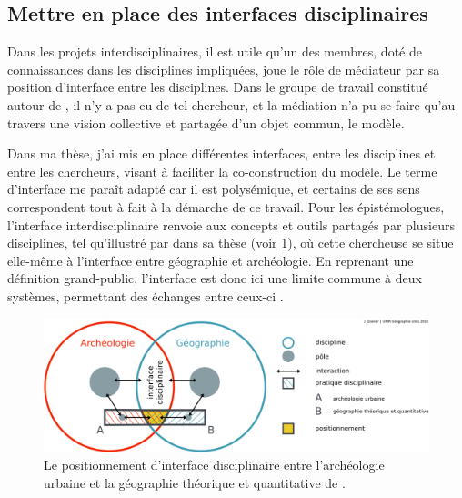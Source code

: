 \subsection{Mettre en place des interfaces disciplinaires\label{subsec:interfaces}}

Dans les projets interdisciplinaires, il est utile qu'un des membres, doté de connaissances dans les disciplines impliquées, joue le rôle de médiateur par sa position d'interface entre les disciplines.
Dans le groupe de travail constitué autour de \simfeodal{}, il n'y a pas eu de tel chercheur, et la médiation n'a pu se faire qu'au travers une vision collective et partagée d'un objet commun, le modèle.

Dans ma thèse, j'ai mis en place différentes \og interfaces\fg{}, entre les disciplines et entre les chercheurs, visant à faciliter la co-construction du modèle.
Le terme d'interface me paraît adapté car il est polysémique, et certains de ses sens correspondent tout à fait à la démarche de ce travail.
Pour les épistémologues, l'interface interdisciplinaire renvoie aux concepts et outils partagés par plusieurs disciplines, tel qu'illustré par \textcite{gravier_deux_2018} dans sa thèse (voir \cref{fig:interfaces-julie}), où cette chercheuse se situe elle-même à l'interface entre géographie et archéologie.
En reprenant une définition grand-public, l'interface est donc ici une \og limite commune à deux systèmes, permettant des échanges entre ceux-ci\fg{} \autocite{larousse_interface_2019}.

\begin{figure}[H]
	\centering
	\includegraphics[width=\linewidth]{img/interfaces_disciplinaires_julie.png}
	\caption[Le \og positionnement d'interface disciplinaire entre l'archéologie urbaine et la géographie théorique et quantitative \fg{} de \textcite{gravier_deux_2018}]{Le \og positionnement d'interface disciplinaire entre l'archéologie urbaine et la géographie théorique et quantitative \fg{} de \textcite[fig. 1.3, \ppno~18]{gravier_deux_2018}.}
	\label{fig:interfaces-julie}
\end{figure}

